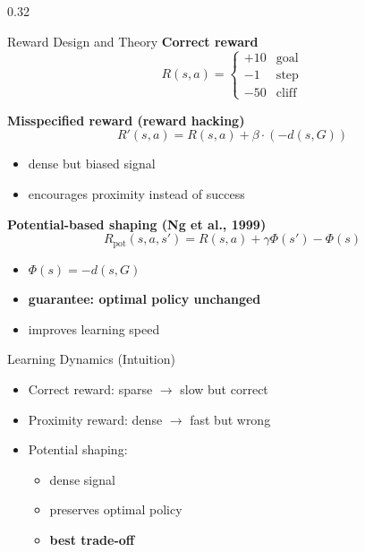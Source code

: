 \begin{frame}[t]
\begin{columns}[t]
\begin{column}{0.32\textwidth}
\begin{block}{Reward Design and Theory}
				\textbf{Correct reward}
				\[
					R(s,a)=
					\begin{cases}
						+10 & \text{goal}  \\
						-1  & \text{step}  \\
						-50 & \text{cliff}
					\end{cases}
				\]

				\medskip

				\textbf{Misspecified reward (reward hacking)}
				\[
					R'(s,a)=R(s,a)+\beta \cdot (-d(s,G))
				\]

				\begin{itemize}
					\item dense but biased signal
					\item encourages proximity instead of success
				\end{itemize}

				\medskip

				\textbf{Potential-based shaping (Ng et al., 1999)}
				\[
					R_{\text{pot}}(s,a,s')=R(s,a)+\gamma \Phi(s')-\Phi(s)
				\]

				\begin{itemize}
					\item $\Phi(s)=-d(s,G)$
					\item \textbf{guarantee: optimal policy unchanged}
					\item improves learning speed
				\end{itemize}

				\begin{alertblock}{Learning Dynamics (Intuition)}

					\begin{itemize}
						\item Correct reward: sparse $\rightarrow$ slow but correct
						\item Proximity reward: dense $\rightarrow$ fast but wrong
						\item Potential shaping:
						      \begin{itemize}
							      \item dense signal

							            \medskip

							      \item preserves optimal policy

							            \medskip

							      \item \textbf{best trade-off}
						      \end{itemize}
					\end{itemize}


\end{alertblock}
\end{block}
\end{column}
\end{columns}
\end{frame}
